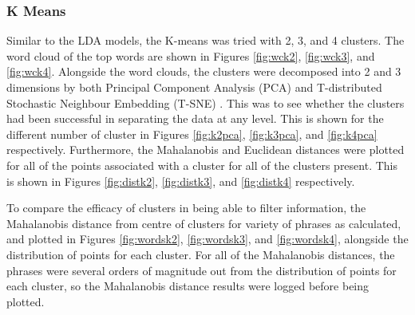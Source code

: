 \subsubsection{K Means}
Similar to the LDA models, the K-means was tried with 2, 3, and 4 clusters. The word cloud of the top words are shown in Figures \ref{fig:wck2}, \ref{fig:wck3}, and \ref{fig:wck4}. Alongside the word clouds, the clusters were decomposed into 2 and 3 dimensions by both Principal Component Analysis (PCA) and T-distributed Stochastic Neighbour Embedding (T-SNE) \cite{maaten2008visualizing}. This was to see whether the clusters had been successful in separating the data at any level. This is shown for the different number of cluster in Figures \ref{fig:k2pca}, \ref{fig:k3pca}, and \ref{fig:k4pca} respectively. Furthermore, the Mahalanobis and Euclidean distances were plotted for all of the points associated with a cluster for all of the clusters present. This is shown in Figures \ref{fig:distk2}, \ref{fig:distk3}, and \ref{fig:distk4} respectively. 

To compare the efficacy of clusters in being able to filter information, the Mahalanobis distance from centre of clusters for variety of phrases as calculated, and plotted in Figures \ref{fig:wordsk2}, \ref{fig:wordsk3}, and \ref{fig:wordsk4}, alongside the distribution of points for each cluster. For all of the Mahalanobis distances, the phrases were several orders of magnitude out from the distribution of points for each cluster, so the Mahalanobis distance results were logged before being plotted.  
